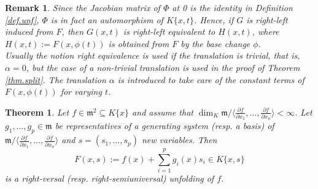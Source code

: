 \documentclass[11pt]{article}
\newtheorem{Theorem}[Definition]{Theorem}
\newtheorem{Remark}[Definition]{Remark}
\newcommand{\fm}{\mathfrak{m}}
\begin{document}
\begin{Remark}\label{rm.unf}{\em
Since the Jacobian matrix of $\Phi$ at 0 is the identity in Definition \ref{def.unf}, $\Phi$ is in fact an automorphism of $K\{x,t\}$. Hence, if $G$ is right-left induced from $F$, then $G(x,t)$ is right-left equivalent to 
$H(x,t)$, where $H(x,t) := F(x,\phi(t))$ is obtained from $F$ by the base change $\phi$.\\
Usually the notion right equivalence is used if the translation is trivial, that is, $\alpha=0$, but the case  of a non-trivial translation is used in the proof of Theorem \ref{thm.split}.
The  translation $\alpha$  is  introduced to take care of the constant terms of $ F(x,{\phi(t)})$ for varying $t$. }
 \end{Remark}

\begin{Theorem}\label{thm.suunf}
Let $f\in \fm^2 \subseteq K\{x\}$ and assume that $\dim_K\fm/\langle\frac{\partial f}{\partial x_1},\ldots,\frac{\partial f}{\partial x_n}\rangle<\infty$.
Let $g_1,\ldots,g_p\in \fm$ be representatives of a generating system (resp. a basis) of $\fm/\langle\frac{\partial f}{\partial x_1},\ldots,\frac{\partial f}{\partial x_n}\rangle$ 
and $s=(s_1,\ldots,s_p)$ new variables.
Then 
$$F(x,s) := f(x)+\sum_{i=1}^pg_i(x)s_i\in K\{x,s\}$$ is a right-versal (resp. right-semiuniversal) unfolding  of $f$.
\end{Theorem}
\end{document}
